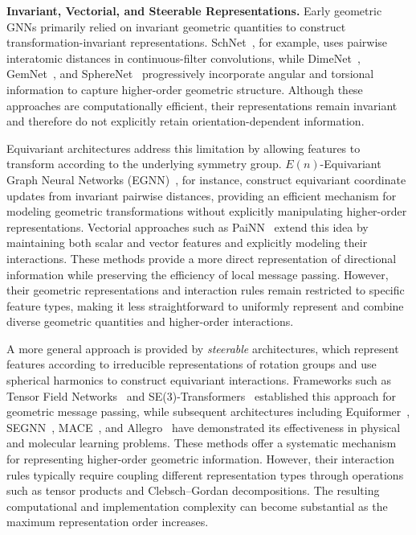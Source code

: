 \documentclass[10pt]{article}
\begin{document}
\noindent\textbf{Invariant, Vectorial, and Steerable Representations.}
Early geometric GNNs primarily relied on invariant geometric quantities to construct transformation-invariant representations. SchNet~\citep{schnet}, for example, uses pairwise interatomic distances in continuous-filter convolutions, while DimeNet~\citep{dimenet}, GemNet~\citep{gemnet}, and SphereNet~\citep{spherenet} progressively incorporate angular and torsional information to capture higher-order geometric structure. Although these approaches are computationally efficient, their representations remain invariant and therefore do not explicitly retain orientation-dependent information.

Equivariant architectures address this limitation by allowing features to transform according to the underlying symmetry group. $E(n)$-Equivariant Graph Neural Networks (EGNN)~\citep{egnn}, for instance, construct equivariant coordinate updates from invariant pairwise distances, providing an efficient mechanism for modeling geometric transformations without explicitly manipulating higher-order representations. Vectorial approaches such as PaiNN~\citep{schutt2021equivariant} extend this idea by maintaining both scalar and vector features and explicitly modeling their interactions. These methods provide a more direct representation of directional information while preserving the efficiency of local message passing. However, their geometric representations and interaction rules remain restricted to specific feature types, making it less straightforward to uniformly represent and combine diverse geometric quantities and higher-order interactions.

A more general approach is provided by \textit{steerable} architectures, which represent features according to irreducible representations of rotation groups and use spherical harmonics to construct equivariant interactions. Frameworks such as Tensor Field Networks~\citep{tfn} and SE(3)-Transformers~\citep{se3Transformer} established this approach for geometric message passing, while subsequent architectures including Equiformer~\citep{equiformer}, SEGNN~\citep{segnn}, MACE~\citep{mace}, and Allegro~\citep{allegro} have demonstrated its effectiveness in physical and molecular learning problems. These methods offer a systematic mechanism for representing higher-order geometric information. However, their interaction rules typically require coupling different representation types through operations such as tensor products and Clebsch--Gordan decompositions. The resulting computational and implementation complexity can become substantial as the maximum representation order increases.
\end{document}

